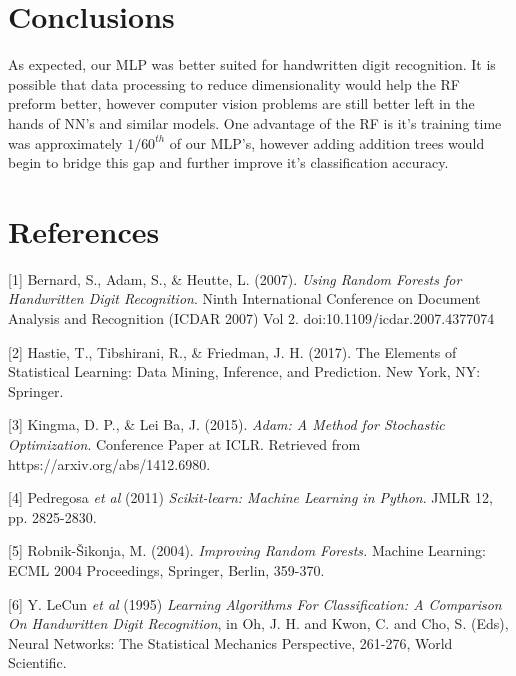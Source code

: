 \documentclass{article}
\begin{document}
\section{Conclusions}
As expected, our MLP was better suited for handwritten digit recognition. It is possible that data processing to reduce dimensionality would help the RF preform better, however computer vision problems are still better left in the hands of NN's and similar models. One advantage of the RF is it's training time was approximately $1/60^{th}$ of our MLP's, however adding addition trees would begin to bridge this gap and further improve it's classification accuracy. 

\clearpage

\section*{References}
\medskip

\small

[1] Bernard, S., Adam, S., & Heutte, L. (2007). \textit{Using Random Forests for Handwritten Digit Recognition}. Ninth International Conference on Document Analysis and Recognition (ICDAR 2007) Vol 2. doi:10.1109/icdar.2007.4377074

[2] Hastie, T., Tibshirani, R., & Friedman, J. H. (2017). The Elements of Statistical Learning: Data Mining, Inference, and Prediction. New York, NY: Springer.

[3] Kingma, D. P., & Lei Ba, J. (2015). 
\textit{Adam: A Method for Stochastic Optimization}. Conference Paper at ICLR. Retrieved from https://arxiv.org/abs/1412.6980.

[4] Pedregosa \textit{et al} (2011) \textit{Scikit-learn: Machine Learning in Python}. JMLR 12, pp. 2825-2830.

[5] Robnik-Šikonja, M. (2004). \textit{Improving Random Forests.} Machine Learning: ECML 2004 Proceedings, Springer, Berlin, 359-370.

[6] Y. LeCun \textit{et al} (1995) \textit{Learning Algorithms For Classification: A Comparison On Handwritten Digit Recognition}, in Oh, J. H. and Kwon, C. and Cho, S. (Eds), Neural Networks: The Statistical Mechanics Perspective, 261-276, World Scientific.
\end{document}
